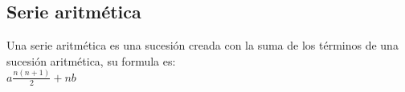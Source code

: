 \subsection{Serie aritmética}
Una serie aritmética es una sucesión creada con la suma de los términos de una sucesión aritmética, su formula es:
\\$a\frac{n(n+1)}{2}+nb$
